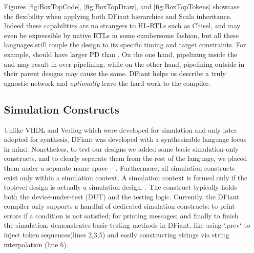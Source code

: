Figures \ref{fig:BoxTopCode}, \ref{fig:BoxTopDraw}, and \ref{fig:BoxTopTokens} showcase the flexibility when applying both DFiant hierarchies and Scala inheritance. Indeed these capabilities are no strangers to HL-RTLs such as Chisel, and may even be expressible by native RTLs in some cumbersome fashion, but all these languages still couple the design to its specific timing and target constraints. For example,   should have larger PD than . On the one hand, pipelining inside the  and  may result in over-pipelining. while on the other hand, pipelining outside in their parent designs may cause the same. DFiant helps us describe a truly agnostic network and \emph{optionally} leave the hard work to the compiler. 




\subsection{Simulation Constructs}
\label{sec:simulation}
Unlike VHDL and Verilog which were developed for simulation and only later adopted for synthesis, DFiant was developed with a synthesizable language focus in mind. Nonetheless, to test our designs we added some basic simulation-only constructs, and to clearly separate them from the rest of the language, we placed them under a separate name space -- . Furthermore, all simulation constructs exist only within a simulation context. A simulation context is formed only if the toplevel design is actually a simulation design, . The  construct typically holds both the device-under-test (DUT) and the testing logic. Currently, the DFiant compiler only supports a handful of dedicated simulation constructs:
 to print errors if a condition is not satisfied;  for printing messages; and finally  to finish the simulation. 
 demonstrates basic testing methods in DFiant, like using `.prev` to inject token sequences(lines 2,3,5) and easily constructing strings via string interpolation (line 6).

